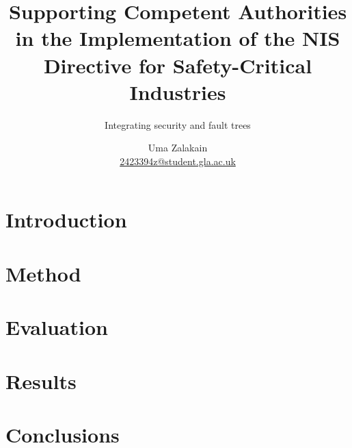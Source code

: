 \documentclass{scrreprt}
\begin{document}
\title{Supporting Competent Authorities in the Implementation of the NIS
Directive for Safety-Critical Industries}
\subtitle{Integrating security and fault trees}
\author{Uma Zalakain \\ \href{mailto:2423394z@student.gla.ac.uk}{2423394z@student.gla.ac.uk}}

{\let\newpage\relax\maketitle}
\doclicenseThis
\newpage

\setcounter{tocdepth}{2}
\tableofcontents
\newpage
{}

\chapter{Introduction}

\chapter{Method}

\chapter{Evaluation}

\chapter{Results}

\chapter{Conclusions}




\newpage
\begin{appendices}
\end{appendices}
\end{document}
